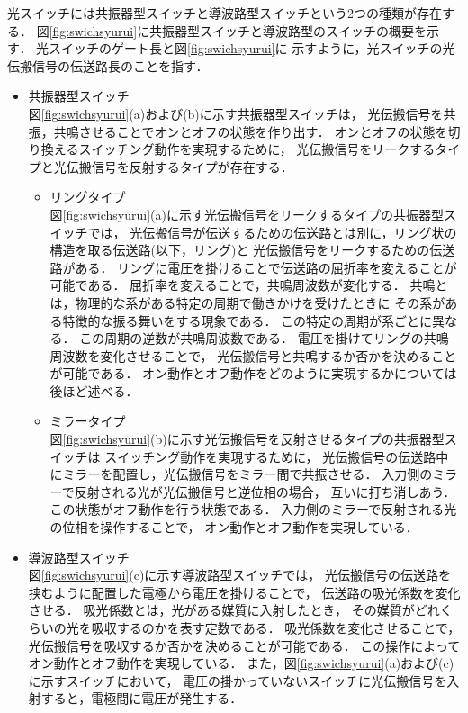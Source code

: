 光スイッチには共振器型スイッチと導波路型スイッチという2つの種類が存在する．
図\ref{fig:swichsyurui}に共振器型スイッチと導波路型のスイッチの概要を示す．
光スイッチのゲート長と図\ref{fig:swichsyurui}に
示すように，光スイッチの光伝搬信号の伝送路長のことを指す．
\begin{itemize}
\item 共振器型スイッチ\\
図\ref{fig:swichsyurui}(a)および(b)に示す共振器型スイッチは，
光伝搬信号を共振，共鳴させることでオンとオフの状態を作り出す．
オンとオフの状態を切り換えるスイッチング動作を実現するために，
光伝搬信号をリークするタイプと光伝搬信号を反射するタイプが存在する．
\begin{itemize}
\item リングタイプ\\
図\ref{fig:swichsyurui}(a)に示す光伝搬信号をリークするタイプの共振器型スイッチでは，
光伝搬信号が伝送するための伝送路とは別に，リング状の構造を取る伝送路(以下，リング)と
光伝搬信号をリークするための伝送路がある．
リングに電圧を掛けることで伝送路の屈折率を変えることが可能である．
屈折率を変えることで，共鳴周波数が変化する．
共鳴とは，物理的な系がある特定の周期で働きかけを受けたときに
その系がある特徴的な振る舞いをする現象である．
この特定の周期が系ごとに異なる．
この周期の逆数が共鳴周波数である．
電圧を掛けてリングの共鳴周波数を変化させることで，
光伝搬信号と共鳴するか否かを決めることが可能である．
オン動作とオフ動作をどのように実現するかについては後ほど述べる．
\item ミラータイプ\\
図\ref{fig:swichsyurui}(b)に示す光伝搬信号を反射させるタイプの共振器型スイッチは
スイッチング動作を実現するために，
光伝搬信号の伝送路中にミラーを配置し，光伝搬信号をミラー間で共振させる．
入力側のミラーで反射される光が光伝搬信号と逆位相の場合，
互いに打ち消しあう．
この状態がオフ動作を行う状態である．
入力側のミラーで反射される光の位相を操作することで，
オン動作とオフ動作を実現している．
\end{itemize}
\item 導波路型スイッチ\\
図\ref{fig:swichsyurui}(c)に示す導波路型スイッチでは，
光伝搬信号の伝送路を挟むように配置した電極から電圧を掛けることで，
伝送路の吸光係数を変化させる．
吸光係数とは，光がある媒質に入射したとき，
その媒質がどれくらいの光を吸収するのかを表す定数である．
吸光係数を変化させることで，光伝搬信号を吸収するか否かを決めることが可能である．
この操作によってオン動作とオフ動作を実現している．
また，図\ref{fig:swichsyurui}(a)および(c)に示すスイッチにおいて，
電圧の掛かっていないスイッチに光伝搬信号を入射すると，電極間に電圧が発生する．
\end{itemize}

